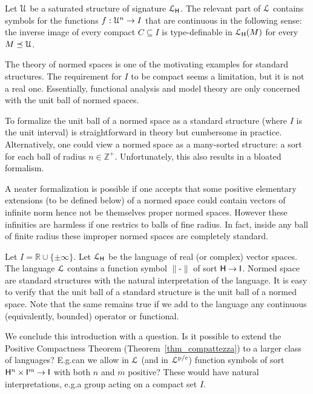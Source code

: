 \documentclass{amsproc}
\begin{document}
\begin{example}\label{ex_HPP}
  Let ${\EuScript U}$ be a saturated structure of signature ${\EuScript L}_{\sf H}$.
  The relevant part of ${\EuScript L}$ contains symbols for the functions $f:{\EuScript U}^n\to I$ that are continuous in the following sense: the inverse image of every compact $C\subseteq I$ is type-definable in ${\EuScript L}_{\sf H}(M)$ for every $M\preceq{\EuScript U}$.
\end{example}

The theory of normed spaces is one of the motivating examples for standard structures.
The requirement for $I$ to be compact seems a limitation, but it is not a real one.
Essentially, functional analysis and model theory are only concerned with the unit ball of normed spaces.

To formalize the unit ball of a normed space as a standard structure (where $I$ is the unit interval) is straightforward in theory but cumbersome in practice.
Alternatively, one could view a normed space as a many-sorted structure: a sort for each ball of radius $n\in\mathds{Z}^+$.
Unfortunately, this also results in a bloated formalism.

A neater formalization is possible if one accepts that some positive elementary extensions (to be defined below) of a normed space could contain vectors of infinite norm hence not be themselves proper normed spaces.
However these infinities are harmless if one restrics to balls of fine radius.
In fact, inside any ball of finite radius these improper normed spaces are completely standard.

\begin{example}\label{ex_normed_spaces}
Let $I=\mathds{R}\cup\{\pm\infty\}
$.
Let ${\EuScript L}_{\sf H}$ be the language of real (or complex) vector spaces.
The language ${\EuScript L}$ contains a function symbol $\|\mbox{-}\|$ of sort ${\sf H}\to {\sf I}$.
Normed space are standard structures with the natural interpretation of the language.
It is easy to verify that the unit ball of a standard structure is the unit ball of a normed space.
Note that the same remains true if we add to the language any continuous (equivalently, bounded) operator or functional.
\end{example}

We conclude this introduction with a question.
Is it possible to extend the Positive Compactness Theorem (Theorem~\ref{thm_compattezza}) to a larger class of languages?
E.g.\@ can we allow in ${\EuScript L}$ (and in ${\EuScript L}^{\rm p/c}$) function symbols of sort ${\sf H}^n\times {\sf I}^m\to {\sf I}$ with both $n$ and $m$ positive?
These would have natural interpretations, e.g.\@ a group acting on a compact set $I$.
\end{document}
